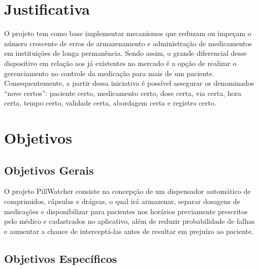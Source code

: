 \section{Justificativa}

O projeto tem como base implementar mecanismos que reduzam ou impeçam o número crescente de erros de armazenamento e administração de medicamentos em instituições de longa permanência. Sendo assim, o grande diferencial desse dispositivo em relação aos já existentes no mercado é a opção de realizar o gerenciamento no controle da medicação para mais de um paciente. Consequentemente, a partir dessa iniciativa  é possível assegurar os denominados “nove certos”: paciente certo, medicamento certo, dose certa, via certa, hora certa, tempo certo, validade certa, abordagem certa e registro certo.

\section{Objetivos}
\subsection{Objetivos Gerais}

O projeto PillWatcher consiste na concepção de um dispensador automático de comprimidos, cápsulas e drágeas, o qual irá armazenar, separar dosagens de medicações e disponibilizar para pacientes nos horários previamente prescritos pelo médico e cadastrados no aplicativo, além de reduzir probabilidade de falhas e aumentar a chance de interceptá-las antes de resultar em prejuízo ao paciente.

\subsection{Objetivos Específicos} \label{section:Obj_esp}

